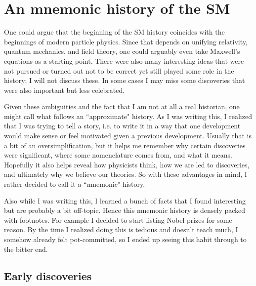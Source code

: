 \section{An mnemonic history of the SM}

One could argue that the beginning of the SM history coincides with the
beginnings of modern particle physics. Since that depends on unifying
relativity, quantum mechanics, and field theory, one could arguably even take
Maxwell's equations as a starting point. 
There were also many interesting ideas that were not pursued or turned out
not to be correct yet still played some role in the history; I will not
discuss these. In some cases I may miss some discoveries that were also
important but less celebrated.

Given these ambiguities and the fact
that I am not at all a real historian, 
one might call what follows an ``approximate" history.
As I was writing this, I realized that I was trying to tell a story, i.e.
to write it in a way that one development would make sense or feel
motivated given a previous development. Usually that is a bit of an
oversimplification, but it helps me remember why certain discoveries were
significant, where some nomenclature comes from, and what it means. Hopefully it
also helps reveal how physicists think, how we are led to discoveries, and
ultimately why we believe our theories. So with these advantages in mind, I
rather decided to call it a ``mnemonic" history. 

Also while I was writing this, I learned a bunch of facts that I found
interesting but are probably a bit off-topic. Hence this mnemonic history is
densely packed with footnotes. For example I decided to start listing Nobel
prizes for some reason. By the time I realized doing this is tedious and doesn't
teach much, I somehow already felt pot-committed, so I ended up seeing this habit
through to the bitter end. 

\subsection{Early discoveries}


